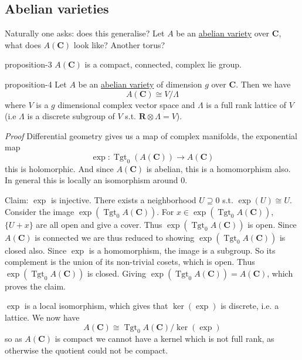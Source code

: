 \documentclass[10pt,]{book}
\makeatletter
\renewcommand*{\proofname}{Proof}
\renewenvironment{proof}[1][\proofname]{\par
  \pushQED{\qed}%
  \normalfont \topsep6\p@\@plus6\p@\relax
  \trivlist
  \item\relax
    {\itshape
    #1\@addpunct{.}}\hspace\labelsep\ignorespaces
}{%
  \popQED\endtrivlist\@endpefalse
}
\numberwithin{equation}{section}
\newcommand{\RR}{\mathbf{R}}
\newcommand{\CC}{\mathbf{C}}
\DeclareMathOperator{\Tgt}{Tgt}
\makeatother
\begin{document}
\subsection[{Abelian varieties}]{Abelian varieties}\label{subsection-4}
\hypertarget{p-40}{}%
Naturally one asks: does this generalise? Let \(A\) be an \hyperref[def-buntes-abvar]{abelian variety} over \(\CC\), what does \(A(\CC)\) look like? Another torus?%
\begin{proposition}{}{}{proposition-3}%
\hypertarget{p-41}{}%
\(A(\CC)\) is a compact, connected, complex lie group.%
\end{proposition}
\begin{proposition}{}{}{proposition-4}%
\hypertarget{p-42}{}%
Let \(A\) be an \hyperref[def-buntes-abvar]{abelian variety} of dimension \(g\) over \(\CC\). Then we have%
\begin{equation*}
A(\CC) \cong V/\Lambda
\end{equation*}
where \(V\) is a \(g\) dimensional complex vector space and \(\Lambda\) is a full rank lattice of \(V\) (i.e \(\Lambda\) is a discrete subgroup of \(V\) s.t. \(\RR\otimes \Lambda  = V\)).%
\end{proposition}
\begin{proof}\hypertarget{proof-8}{}
\hypertarget{p-43}{}%
Differential geometry gives us a map of complex manifolds, the exponential map%
\begin{equation*}
\exp\colon\Tgt_0(A(\CC)) \to A(\CC)
\end{equation*}
this is holomorphic. And since \(A(\CC)\) is abelian, this is a homomorphism also. In general this is locally an isomorphism around 0.%
\par
\hypertarget{p-44}{}%
Claim: \(\exp\) is injective. There exists a neighborhood \(U\supseteq 0\) s.t. \(\exp(U) \cong U\). Consider the image \(\exp(\Tgt_0 A(\CC))\). For \(x\in \exp(\Tgt_0 A(\CC))\), \(\{U+x\}\) are all open and give a cover. Thus \(\exp(\Tgt_0A(\CC))\) is open. Since \(A(\CC)\) is connected we are thus reduced to showing \(\exp(\Tgt_0 A(\CC))\) is closed also. Since \(\exp\) is a homomorphism, the image is a subgroup. So its complement is the union of its non-trivial cosets, which is open. Thus \(\exp(\Tgt_0A(\CC))\) is closed. Giving \(\exp(\Tgt_0A(\CC)) = A(\CC)\), which proves the claim.%
\par
\hypertarget{p-45}{}%
\(\exp\) is a local isomorphism, which gives that \(\ker(\exp)\) is discrete, i.e. a lattice. We now have%
\begin{equation*}
A(\CC) \cong \Tgt_0A(\CC)/ \ker(\exp)
\end{equation*}
so as \(A(\CC)\) is compact we cannot have a kernel which is not full rank, as otherwise the quotient could not be compact.%
\end{proof}
\end{document}
